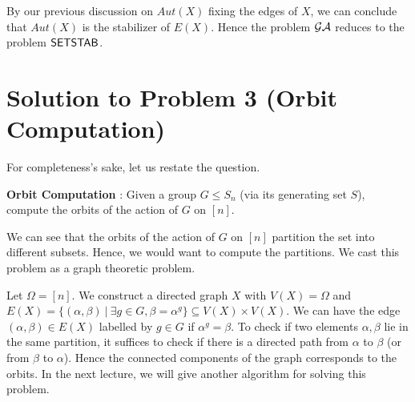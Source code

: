 By our previous discussion on $Aut(X)$ fixing the edges of $X$, we can
conclude that $Aut(X)$ is the stabilizer of $E(X)$. Hence the problem $\mathcal{GA}$
reduces to the problem ${\sf SETSTAB}$.

\section{Solution to Problem 3 (Orbit Computation)}
For completeness's sake, let us restate the question. 

{\bf Orbit Computation} : Given a group $G \le S_{n}$ (via its generating set
$S$), compute the orbits of the action of $G$ on $[n]$.

We can see that the orbits of the action of $G$ on $[n]$ partition the set
into different subsets. Hence, we would want to compute the partitions. We
cast this problem as a graph theoretic problem.

Let $\Omega = [n]$. We construct a directed graph $X$ with $V(X) = \Omega$ and
$E(X) = \{(\alpha, \beta) ~ | ~ \exists g \in G, \beta = \alpha^g \} \subseteq
V(X) \times V(X)$.  We can have the edge $(\alpha, \beta) \in E(X)$ labelled
by $g \in G$ if $\alpha^g = \beta$. To check if two elements $\alpha, \beta$
lie in the same partition, it suffices to check if there is a directed path
from $\alpha$ to $\beta$ (or from $\beta$ to $\alpha$). Hence the connected
components of the graph corresponds to the orbits. In the next lecture, we
will give another algorithm for solving this problem.


